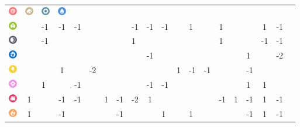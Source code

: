\begin{table}[h]
\begin{center}
\begin{tabular}{c c g c g c g c g c g c g c g c g c g c}
    \includegraphics[width=1em]{images/psychic.png} &
    \includegraphics[width=1em]{images/rock.png} &
    \includegraphics[width=1em]{images/steel.png} &
    \includegraphics[width=1em]{images/water.png} &
    \\
    \includegraphics[width=1em]{images/bug.png} & & -1 & -1 & -1 & & & & -1 & -1 & -1 & & 1 & & 1 & & & 1 & -1 \\ %
    \includegraphics[width=1em]{images/dark.png} & & -1 & & & & & & 1 & & & & & & 1 & & & -1 & -1 \\ %
    \includegraphics[width=1em]{images/dragon.png} & & & & & & & & & -1 & & & & & & & 1 & & -2 \\ %
    \includegraphics[width=1em]{images/electric.png} & & & 1 & & -2 & & & & & & 1 & -1 & -1 & & & -1 & & \\ %
    \includegraphics[width=1em]{images/fairy.png} & & 1 & & -1 & & & & & -1 & -1 & & & & & & 1 & 1 & \\ %
    \includegraphics[width=1em]{images/fighting.png} & 1 & & -1 & -1 & & 1 & -1 & -2 & 1 & & & & & -1 & 1 & -1 & 1 & -1 \\ %
    \includegraphics[width=1em]{images/fire.png} & 1 & & -1 & & & & -1 & & & 1 & & 1 & & & & -1 & 1 & -1 \\ %

\end{tabular}
\end{center}
\end{table}
